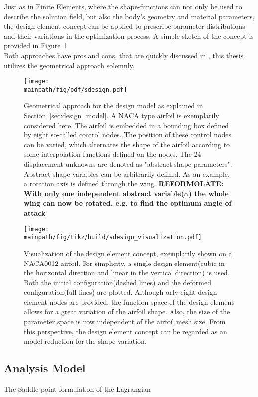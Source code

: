 \documentclass[../main.tex]{subfiles}
\begin{document}
Just as in Finite Elements, where the shape-functions can not only be used to describe the solution field, but also the body's geometry and material parameters, the design element concept can be applied to prescribe parameter distributions and their variations in the optimization process. A simple sketch of the concept is provided in Figure~\ref{fig:sketch_geometrical_approach}
\\
Both approaches have pros and cons, that are quickly discussed in \cite{Maute2003}, this thesis utilizes the geometrical approach solemnly.

\begin{figure}[h!]
	\begin{center}
        \texttt{[image: \\mainpath/fig/pdf/sdesign.pdf]}
        \caption[Design-model: geometrical approach]{Geometrical approach for the design model as explained in Section~\ref{sec:design_model}. A NACA type airfoil is exemplarily considered here. The airfoil is embedded in a bounding box defined by eight so-called control nodes. The position of these control nodes can be varied, which alternates the shape of the airfoil according to some interpolation functions defined on the nodes. The 24 displacement unknowns are denoted as "abstract shape parameters". Abstract shape variables can be arbitrarily defined. As an example, a rotation axis is defined through the wing. \textbf{REFORMOLATE: With only one independent abstract variable($\alpha$) the whole wing can now be rotated, e.g. to find the optimum angle of attack}}
		\label{fig:sketch_geometrical_approach}
    \end{center}
\end{figure}

\begin{figure}[h!]
	\begin{center}
        \texttt{[image: \\mainpath/fig/tikz/build/sdesign\_visualization.pdf]}
        \caption[Design element visualization]{Visualization of the design element concept, exemplarily shown on a NACA0012 airfoil. For simplicity, a single design element(cubic in the horizontal direction and linear in the vertical direction) is used. Both the initial configuration(dashed lines) and the deformed configuration(full lines) are plotted. Although only eight design element nodes are provided, the function space of the design element allows for a great variation of the airfoil shape. Also, the size of the parameter space is now independent of the airfoil mesh size. From this perspective, the design element concept can be regarded as an model reduction for the shape variation.}
		\label{designelement_concept_2D}
    \end{center}
\end{figure}

\subsection{Analysis Model}\label{sec:analysis_model}

The Saddle point formulation of the Lagrangian
\end{document}
